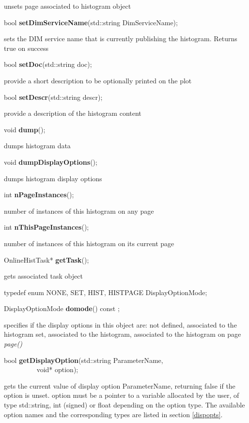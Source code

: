  unsets page associated to histogram object


\item    bool {\bf setDimServiceName}(std::string DimServiceName);


 sets the DIM service name that is currently publishing the histogram. Returns true on success


\item    bool {\bf setDoc}(std::string doc);


 provide a short description to be optionally printed on the plot 


\item    bool {\bf setDescr}(std::string descr);


 provide a  description of the histogram content 


\item    void {\bf dump}();


 dumps histogram data


\item    void {\bf dumpDisplayOptions}();


 dumps histogram display options


\item    int {\bf nPageInstances}();


 number of instances of this histogram on any page


\item    int {\bf nThisPageInstances}();


 number of instances of this histogram on its current page


\item    OnlineHistTask* {\bf getTask}();


 gets associated task object


\item   typedef enum { NONE, SET, HIST, HISTPAGE } DisplayOptionMode;
\item    DisplayOptionMode {\bf domode}() const ;

 specifies if the display options in this object are: not defined,
 associated to the histogram set, associated to the histogram,
 associated to the histogram on  page {\it page()}


\item    bool {\bf getDisplayOption}(std::string ParameterName,\\\mbox{}~~~~~~~~~
			void* option);

 gets the current value of display option ParameterName, returning false if
 the option is unset.
 option must be a pointer to a variable allocated by the user, of type 
 std::string, int (signed) or float depending on the option type.
 The available option names and the corresponding types are listed 
 in section \ref{dispopts}.


